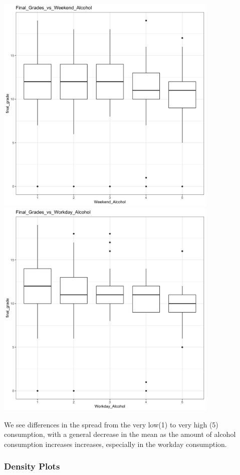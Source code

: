 \documentclass[]{article}
\begin{document}
\includegraphics[width=0.8\textwidth,height=\textheight]{images/Final_Grade_vs_Weekend_Alcohol.png}~\includegraphics[width=0.8\textwidth,height=\textheight]{images/Final_Grade_vs_Workday_Alcohol.png}

We see differences in the spread from the very low(1) to very high (5)
consumption, with a general decrease in the mean as the amount of
alcohol consumption increases increases, especially in the workday
consumption.

\hypertarget{density-plots}{%
\subsubsection{Density Plots}\label{density-plots}}
\end{document}
